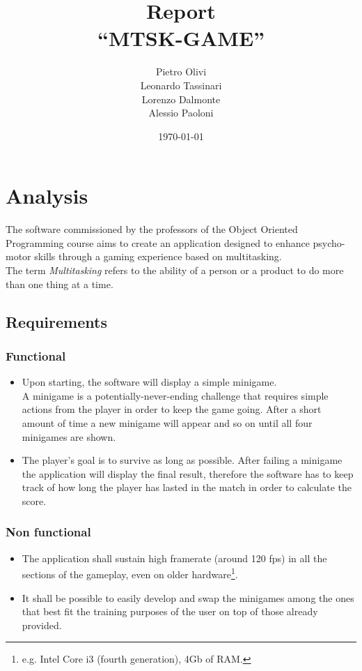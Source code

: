 \documentclass[a4paper,12pt]{report}
\title{Report\\``MTSK-GAME''}
\author{Pietro Olivi\\
Leonardo Tassinari\\
Lorenzo Dalmonte\\
Alessio Paoloni}
\date{\today}
\begin{document}
\maketitle

\tableofcontents

\chapter{Analysis}
The software commissioned by the professors of the Object Oriented Pro\-gramming course aims to create an application designed to enhance psycho-motor skills through a gaming experience based on multitasking.\\
The term \textit{Multitasking} refers to the ability of a person or a product to do more than one thing at a time.

\section{Requirements}
\subsection*{Functional}
\begin{itemize}
	\item Upon starting, the software will display a simple minigame.\\
	A minigame is a potentially-never-ending challenge that requires simple actions from the player in order to keep the game going.
	After a short amount of time a new minigame will appear and so on until all four minigames are shown.
	\item The player's goal is to survive as long as possible. After failing a minigame the application will display the final result, 
  therefore the software has to keep track of how long the player has lasted in the match in order to calculate the score.
\end{itemize}

\subsection*{Non functional}
\begin{itemize}
	\item The application shall sustain high framerate (around 120 fps) in all the sections of the gameplay, even on older hardware\footnote{e.g. Intel Core i3 (fourth generation), 4Gb of RAM.}.
	\item It shall be possible to easily develop and swap the minigames among the ones that best fit the training purposes of the user on top of those already provided. 
\end{itemize}
\end{document}
